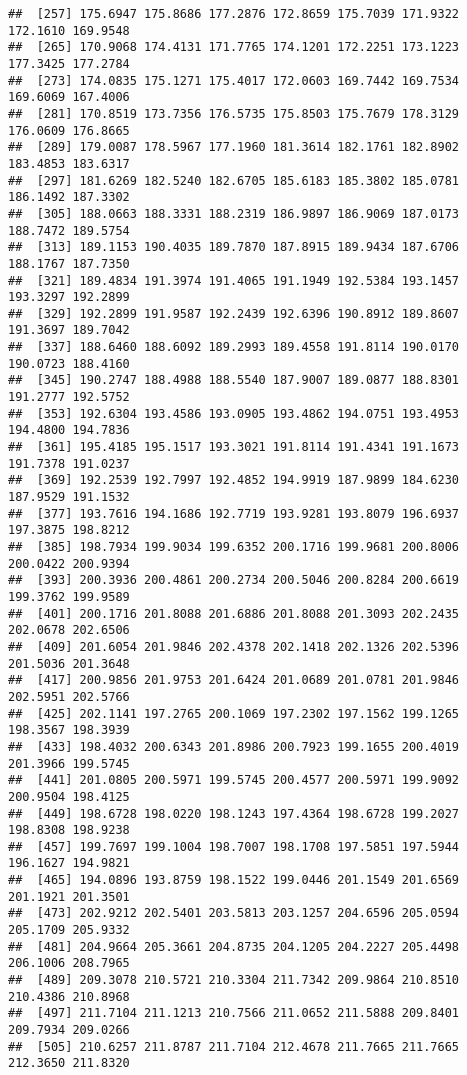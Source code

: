\documentclass[
]{article}
\begin{document}
\begin{verbatim}
##  [257] 175.6947 175.8686 177.2876 172.8659 175.7039 171.9322 172.1610 169.9548
##  [265] 170.9068 174.4131 171.7765 174.1201 172.2251 173.1223 177.3425 177.2784
##  [273] 174.0835 175.1271 175.4017 172.0603 169.7442 169.7534 169.6069 167.4006
##  [281] 170.8519 173.7356 176.5735 175.8503 175.7679 178.3129 176.0609 176.8665
##  [289] 179.0087 178.5967 177.1960 181.3614 182.1761 182.8902 183.4853 183.6317
##  [297] 181.6269 182.5240 182.6705 185.6183 185.3802 185.0781 186.1492 187.3302
##  [305] 188.0663 188.3331 188.2319 186.9897 186.9069 187.0173 188.7472 189.5754
##  [313] 189.1153 190.4035 189.7870 187.8915 189.9434 187.6706 188.1767 187.7350
##  [321] 189.4834 191.3974 191.4065 191.1949 192.5384 193.1457 193.3297 192.2899
##  [329] 192.2899 191.9587 192.2439 192.6396 190.8912 189.8607 191.3697 189.7042
##  [337] 188.6460 188.6092 189.2993 189.4558 191.8114 190.0170 190.0723 188.4160
##  [345] 190.2747 188.4988 188.5540 187.9007 189.0877 188.8301 191.2777 192.5752
##  [353] 192.6304 193.4586 193.0905 193.4862 194.0751 193.4953 194.4800 194.7836
##  [361] 195.4185 195.1517 193.3021 191.8114 191.4341 191.1673 191.7378 191.0237
##  [369] 192.2539 192.7997 192.4852 194.9919 187.9899 184.6230 187.9529 191.1532
##  [377] 193.7616 194.1686 192.7719 193.9281 193.8079 196.6937 197.3875 198.8212
##  [385] 198.7934 199.9034 199.6352 200.1716 199.9681 200.8006 200.0422 200.9394
##  [393] 200.3936 200.4861 200.2734 200.5046 200.8284 200.6619 199.3762 199.9589
##  [401] 200.1716 201.8088 201.6886 201.8088 201.3093 202.2435 202.0678 202.6506
##  [409] 201.6054 201.9846 202.4378 202.1418 202.1326 202.5396 201.5036 201.3648
##  [417] 200.9856 201.9753 201.6424 201.0689 201.0781 201.9846 202.5951 202.5766
##  [425] 202.1141 197.2765 200.1069 197.2302 197.1562 199.1265 198.3567 198.3939
##  [433] 198.4032 200.6343 201.8986 200.7923 199.1655 200.4019 201.3966 199.5745
##  [441] 201.0805 200.5971 199.5745 200.4577 200.5971 199.9092 200.9504 198.4125
##  [449] 198.6728 198.0220 198.1243 197.4364 198.6728 199.2027 198.8308 198.9238
##  [457] 199.7697 199.1004 198.7007 198.1708 197.5851 197.5944 196.1627 194.9821
##  [465] 194.0896 193.8759 198.1522 199.0446 201.1549 201.6569 201.1921 201.3501
##  [473] 202.9212 202.5401 203.5813 203.1257 204.6596 205.0594 205.1709 205.9332
##  [481] 204.9664 205.3661 204.8735 204.1205 204.2227 205.4498 206.1006 208.7965
##  [489] 209.3078 210.5721 210.3304 211.7342 209.9864 210.8510 210.4386 210.8968
##  [497] 211.7104 211.1213 210.7566 211.0652 211.5888 209.8401 209.7934 209.0266
##  [505] 210.6257 211.8787 211.7104 212.4678 211.7665 211.7665 212.3650 211.8320

\end{verbatim}
\end{document}

